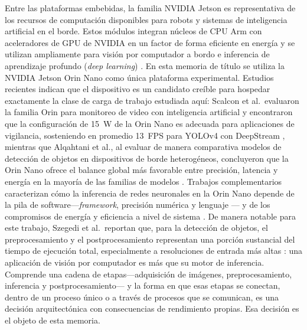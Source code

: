 Entre las plataformas embebidas, la familia NVIDIA Jetson es representativa
de los recursos de computación disponibles para robots y sistemas de
inteligencia artificial en el borde. Estos módulos integran núcleos de CPU
Arm con aceleradores de GPU de NVIDIA en un factor de forma eficiente en
energía y se utilizan ampliamente para visión por computador a bordo e
inferencia de aprendizaje profundo (\emph{deep learning}) \cite{scalcon2024}.
En esta memoria de título se utiliza la NVIDIA Jetson Orin Nano como única plataforma
experimental. Estudios recientes indican que el dispositivo es un candidato
creíble para hospedar exactamente la clase de carga de trabajo estudiada
aquí: Scalcon et al.\ evaluaron la familia Orin para monitoreo de video con
inteligencia artificial y encontraron que la configuración de 15~W de la
Orin Nano es adecuada para aplicaciones de vigilancia, sosteniendo en
promedio 13~FPS para YOLOv4 con DeepStream \cite{scalcon2024}, mientras que
Alqahtani et al., al evaluar de manera comparativa modelos de detección de
objetos en dispositivos de borde heterogéneos, concluyeron que la Orin Nano
ofrece el balance global más favorable entre precisión, latencia y energía
en la mayoría de las familias de modelos \cite{alqahtani2026}. Trabajos
complementarios caracterizan cómo la inferencia de redes neuronales en la
Orin Nano depende de la pila de software---\emph{framework}, precisión
numérica y lenguaje \cite{szegedi2026}--- y de los compromisos de energía y
eficiencia a nivel de sistema \cite{tang2026}. De manera notable para este
trabajo, Szegedi et al.\ reportan que, para la detección de objetos, el
preprocesamiento y el postprocesamiento representan una porción sustancial
del tiempo de ejecución total, especialmente a resoluciones de entrada más
altas \cite{szegedi2026}: una aplicación de visión por computador es más que
su motor de inferencia. Comprende una cadena de etapas---adquisición de
imágenes, preprocesamiento, inferencia y postprocesamiento--- y la forma en
que esas etapas se conectan, dentro de un proceso único o a través de
procesos que se comunican, es una decisión arquitectónica con consecuencias
de rendimiento propias. Esa decisión es el objeto de esta memoria.

